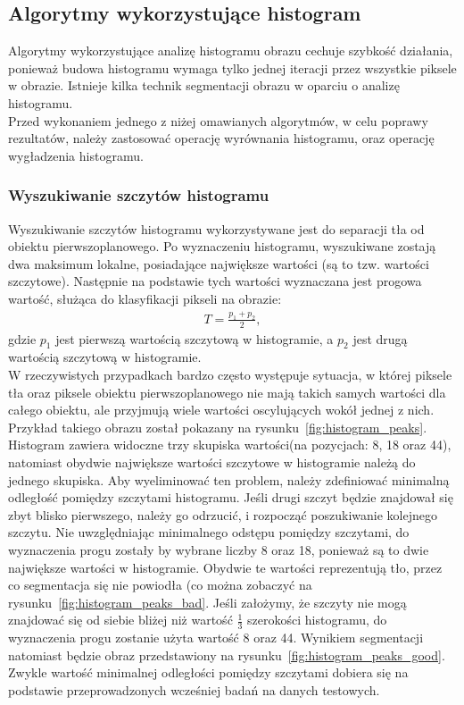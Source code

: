 \subsection{Algorytmy wykorzystujące histogram}
Algorytmy wykorzystujące analizę histogramu obrazu cechuje szybkość działania, ponieważ budowa histogramu wymaga tylko jednej iteracji przez wszystkie piksele w obrazie. Istnieje kilka technik segmentacji obrazu w oparciu o analizę histogramu. \\
Przed wykonaniem jednego z niżej omawianych algorytmów, w celu poprawy rezultatów, należy zastosować operację wyrównania histogramu, oraz operację wygładzenia histogramu.

\subsubsection{Wyszukiwanie szczytów histogramu}
Wyszukiwanie szczytów histogramu wykorzystywane jest do separacji tła od obiektu pierwszoplanowego. Po wyznaczeniu histogramu, wyszukiwane zostają dwa maksimum lokalne, posiadające największe wartości (są to tzw. wartości szczytowe). Następnie na podstawie tych wartości wyznaczana jest progowa wartość, służąca do klasyfikacji pikseli na obrazie:
\begin{gather*}
  T = \frac{p_1 + p_2}{2},
\end{gather*}
gdzie $p_1$ jest pierwszą wartością szczytową w histogramie, a $p_2$ jest drugą wartością szczytową w histogramie. \\
W rzeczywistych przypadkach bardzo często występuje sytuacja, w której piksele tła oraz piksele obiektu pierwszoplanowego nie mają takich samych wartości dla całego obiektu, ale przyjmują wiele wartości oscylujących wokół jednej z nich. Przykład takiego obrazu został pokazany na rysunku~\ref{fig:histogram_peaks}. Histogram zawiera widoczne trzy skupiska wartości(na pozycjach: 8, 18 oraz 44), natomiast obydwie największe wartości szczytowe w histogramie należą do jednego skupiska. Aby wyeliminować ten problem, należy zdefiniować minimalną odległość pomiędzy szczytami histogramu. Jeśli drugi szczyt będzie znajdował się zbyt blisko pierwszego, należy go odrzucić, i rozpocząć poszukiwanie kolejnego szczytu. Nie uwzględniając minimalnego odstępu pomiędzy szczytami, do wyznaczenia progu zostały by wybrane liczby 8 oraz 18, ponieważ są to dwie największe wartości w histogramie. Obydwie te wartości reprezentują tło, przez co segmentacja się nie powiodła (co można zobaczyć na rysunku~\ref{fig:histogram_peaks_bad}. Jeśli założymy, że szczyty nie mogą znajdować się od siebie bliżej niż wartość $\frac{1}{3}$ szerokości histogramu, do wyznaczenia progu zostanie użyta wartość 8 oraz 44. Wynikiem segmentacji natomiast będzie obraz przedstawiony na rysunku~\ref{fig:histogram_peaks_good}. Zwykle wartość minimalnej odległości pomiędzy szczytami dobiera się na podstawie przeprowadzonych wcześniej badań na danych testowych.

